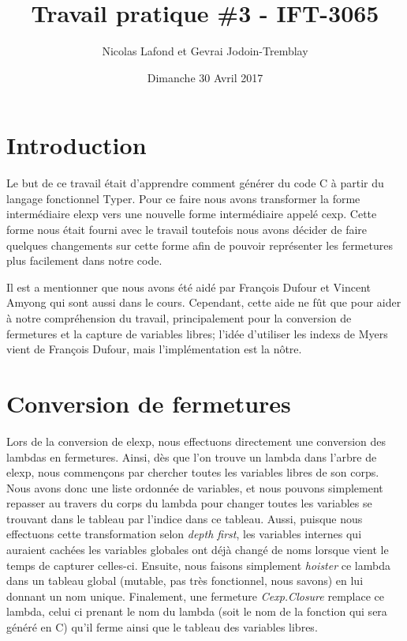 \documentclass{article}
\begin{document}
\title{Travail pratique \#3 - IFT-3065}
\author{Nicolas Lafond et Gevrai Jodoin-Tremblay}
\date{Dimanche 30 Avril 2017}
\maketitle

\section{Introduction}
Le but de ce travail était d'apprendre comment générer du code C à partir du 
langage fonctionnel Typer. Pour ce faire nous avons transformer la forme
intermédiaire elexp vers une nouvelle forme intermédiaire appelé cexp. Cette
forme nous était fourni avec le travail toutefois nous avons décider de faire
quelques changements sur cette forme afin de pouvoir représenter les fermetures
plus facilement dans notre code.

Il est a mentionner que nous avons été aidé par François Dufour et Vincent
Amyong qui sont aussi dans le cours. Cependant, cette aide ne fût que pour aider
à notre compréhension du travail, principalement pour la conversion de
fermetures et la capture de variables libres; l'idée d'utiliser les indexs
de Myers vient de François Dufour, mais l'implémentation est la nôtre.

\section{Conversion de fermetures}

Lors de la conversion de elexp, nous effectuons directement une conversion des
lambdas en fermetures. Ainsi, dès que l'on trouve un lambda dans l'arbre de
elexp, nous commençons par chercher toutes les variables libres de son corps.
\cite{closureconversion} Nous avons donc une liste ordonnée de variables, et
nous pouvons simplement repasser au travers du corps du lambda pour changer
toutes les variables se trouvant dans le tableau par l'indice dans ce tableau.
Aussi, puisque nous effectuons cette transformation selon \emph{depth first},
les variables internes qui auraient cachées les variables globales ont déjà
changé de noms lorsque vient le temps de capturer celles-ci. Ensuite, nous
faisons simplement \emph{hoister} ce lambda dans un tableau global (mutable,
pas très fonctionnel, nous savons) en lui donnant un nom unique. Finalement,
une fermeture \emph{Cexp.Closure} remplace ce lambda, celui ci prenant le nom
du lambda (soit le nom de la fonction qui sera généré en C) qu'il ferme ainsi
que le tableau des variables libres.
\end{document}
